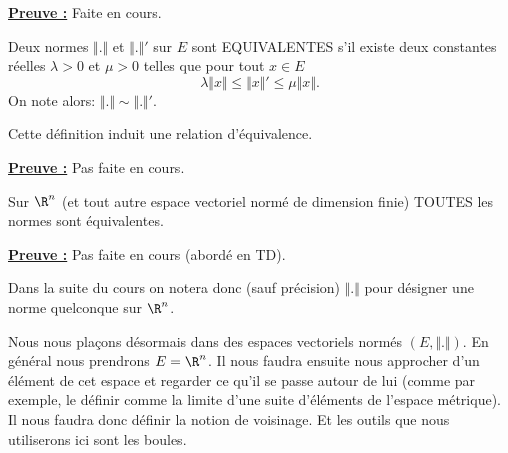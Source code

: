 \documentclass[class=report,crop=false]{standalone}
\begin{document}
\noindent \underline{\bf Preuve :}
Faite en cours.



\begin{definition}
\textcolor[rgb]{0.73,0.00,0.00}{
Deux normes $\Vert . \Vert$ et $\Vert . \Vert '$ sur $E$ sont EQUIVALENTES   
s'il existe deux constantes réelles $\lambda >0$ et $\mu >0$ telles que pour tout $x \in E$
\begin{equation*}
\lambda \Vert x \Vert \leq \Vert x \Vert ' \leq \mu  \Vert x \Vert.
\end{equation*}
On note alors:
$\Vert . \Vert \sim \Vert . \Vert '$.
}
\end{definition}




\begin{proposition}
\textcolor[rgb]{0.50,0.00,0.25}{
Cette définition induit  une relation d'équivalence.
}
\end{proposition}

\noindent \underline{\bf Preuve :}
Pas faite en cours.



\begin{proposition} 
\textcolor[rgb]{0.50,0.00,0.25}{
Sur $\R^n$ (et tout autre espace vectoriel normé de dimension finie) TOUTES les normes
sont équivalentes.
}
\end{proposition}

 \noindent \underline{\bf Preuve :}
Pas faite en cours (abordé en TD).



\begin{remarque*}
\textcolor[rgb]{0.00,0.00,1.00}{
\noindent Dans la suite du cours on notera donc (sauf précision) $\Vert . \Vert$ pour désigner une norme quelconque
sur $\R^n$.
}
\end{remarque*}

 
\noindent Nous nous plaçons désormais dans des espaces vectoriels normés $(E,\Vert . \Vert)$. En général nous prendrons $E=\R^n$. Il nous faudra ensuite nous approcher d'un élément de cet espace et regarder ce qu'il se passe autour de lui (comme par exemple, le définir comme la limite d'une 
suite d'éléments de l'espace métrique). Il nous faudra donc définir la notion de voisinage. Et les outils que nous utiliserons ici sont les boules. 
\end{document}
